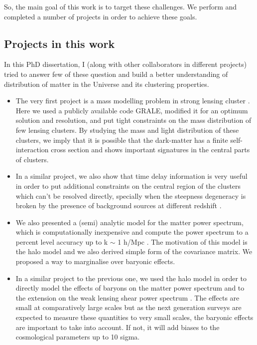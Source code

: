 So, the main goal of this work is to target these challenges. We perform and completed
a number of projects in order to achieve these goals. 


\subsection{Projects in this work}

In this PhD dissertation, I (along with other collaborators in different projects) tried
to answer few of these question and build a better understanding of distribution of 
matter in the Universe and its clustering properties. 

\begin{itemize}
\item	The very first project is a mass modelling problem in strong lensing cluster
	\cite{2014MNRAS.439.2651M}. Here we
	used a publicly available code GRALE, modified it for an optimum solution and resolution,
	and put tight constraints on the mass distribution of few lensing clusters. By studying
	the mass and light distribution of these clusters, we imply that it is possible 
	that the dark-matter has a finite self-interaction cross section and shows
	important signatures in the central parts of clusters. 

\item	In a similar project, we also show that time delay information is very useful in 
	order to put additional constraints on the central region of the clusters which can't 
	be resolved directly, specially when the steepness degeneracy is broken by the 
	presence of background sources at different redshift \cite{2015PASJ...67...21M}.

\item	We also presented a (semi) analytic model for the matter power spectrum, which is
	computationally inexpensive and compute the power spectrum to a percent level 
	accuracy up to k $\sim$ 1 h/Mpc \cite{2014MNRAS.445.3382M}. 
	The motivation of this model is the halo model
	and we also derived simple form of the covariance matrix. We proposed a way to 
	marginalise over baryonic effects. 

\item	In a similar project to the previous one, we used the halo model in order to directly
	model the effects of baryons on the matter power spectrum and to the extension on the
	weak lensing shear power spectrum \cite{2014arXiv1410.6826M}. 
	The effects are small at comparatively large
	scales but as the next generation surveys are expected to measure these quantities 
	to very small scales, the baryonic effects are important to take into account. If not, 
	it will add biases to the cosmological parameters up to 10 sigma. 

\end{itemize}


